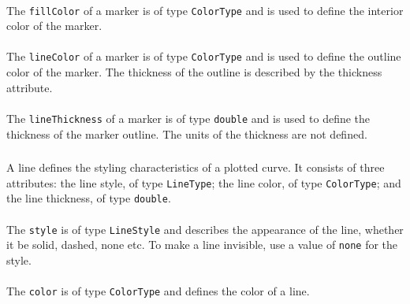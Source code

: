 \paragraph*{}
The {\tt fillColor} of a marker is of type {\tt ColorType} and is used to define the interior color of the marker. 

\paragraph*{}
The {\tt lineColor} of a marker is of type {\tt ColorType} and is used to define the outline color of the marker. The thickness of the outline is described by the thickness attribute.

\paragraph*{}
The {\tt lineThickness} of a marker is of type {\tt double} and is used to define the thickness of the marker outline. The units of the thickness are not defined.

\subsubsection{}
\label{class:Line}
A line defines the styling characteristics of a plotted curve. It consists of three attributes: the line style, of type {\tt LineType}; the line color, of type {\tt ColorType}; and the line thickness, of type {\tt double}.


\paragraph*{}
The {\tt style} is of type {\tt LineStyle} and describes the appearance of the line, whether it be solid, dashed, none etc. To make a line invisible, use a value of {\tt none} for the style. 

\paragraph*{}
The {\tt color} is of type {\tt ColorType} and defines the color of a line.

